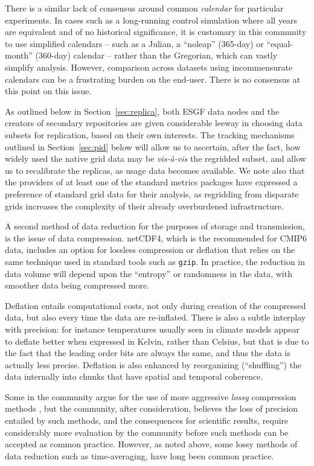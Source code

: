 \documentclass[gmd,manuscript]{copernicus}
\newcommand{\pllabel}[1]{\label{p-#1}\linelabel{l-#1}}
\begin{document}
There is a similar lack of
consensus around common \emph{calendar} for particular experiments.
\pllabel{RC3-13} In cases such as a long-running control simulation
where all years are equivalent and of no historical significance, it
is customary in this community to use simplified calendars -- such as
a Julian, a ``noleap'' (365-day) or ``equal-month'' (360-day) calendar
-- rather than the Gregorian, which can vastly simplify analysis.
However, comparison across datasets using incommensurate calendars can
be a frustrating burden on the end-user. There is no consensus at this
point on this issue.

As outlined below in Section~\ref{sec:replica}, both ESGF data nodes
and the creators of secondary repositories are given considerable
leeway in choosing data subsets for replication, based on their own
interests. The tracking mechanisms outlined in Section~\ref{sec:pid}
below will allow us to ascertain, after the fact, how widely used the
native grid data may be \emph{vis-\`a-vis} the regridded subset, and
allow us to recalibrate the replicas, as usage data becomes available.
We note also that the providers of at least one of the standard
metrics packages \citep[ESMValTool,][]{ref:eyringetal2016a} have
expressed a preference of standard grid data for their analysis, as
regridding from disparate grids increases the complexity of their
already overburdened infrastructure.

A second method of data reduction for the purposes of storage and
transmission, is the issue of data compression. netCDF4, which is the
recommended for CMIP6 data, includes an option for lossless
compression or deflation \citep{ref:zivlempel1977} that relies on the
same technique used in standard tools such as \texttt{gzip}. In
practice, the reduction in data volume will depend upon the
``entropy'' or randomness in the data, with smoother data being
compressed more.

Deflation entails computational costs, not only during creation of the
compressed data, but also every time the data are re-inflated. There
is also a subtle interplay with precision: for instance temperatures
usually seen in climate models appear to deflate better when expressed
in Kelvin, rather than Celsius, but that is due to the fact that the
leading order bits are always the same, and thus the data is actually
less precise. Deflation is also enhanced by reorganizing
(``shuffling'') the data internally into chunks that have spatial and
temporal coherence.

Some in the community argue for the use of more aggressive
\emph{lossy} compression methods \citep{ref:bakeretal2016}, but the
community, after consideration, believes the loss of precision
entailed by such methods, and the consequences for scientific results,
require considerably more evaluation by the community before such
methods can be accepted as common practice. However, as noted above,
some lossy methods of data reduction such as time-averaging, have long
been common practice.
\end{document}
